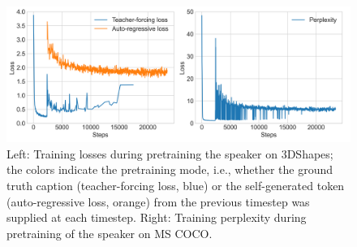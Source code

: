 \begin{figure}
	\centering
	\includegraphics[width=\linewidth]{images/3dshapes_pretraining_losses_ppls.png}
	\caption{Left: Training losses during pretraining the speaker on 3DShapes; the colors indicate the pretraining mode, i.e., whether the ground truth caption (teacher-forcing loss, blue) or the self-generated token (auto-regressive loss, orange) from the previous timestep was supplied at each timestep. Right: Training perplexity during pretraining of the speaker on MS COCO.}
	\label{fig:3dshapes_pretraining}
\end{figure}  



